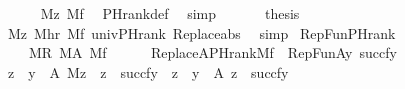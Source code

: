 \begin{isabellebody}
\ \ \ \ \isamarkupfalse%
\ {\isacartoucheopen}M{\isacharparenleft}{\kern0pt}z{\isacharparenright}{\kern0pt}{\isacartoucheclose}\ {\isacartoucheopen}M{\isacharparenleft}{\kern0pt}f{\isacharparenright}{\kern0pt}{\isacartoucheclose}\ \isamarkupfalse%
\ PHrank{\isacharunderscore}{\kern0pt}def\ \isamarkupfalse%
\ simp\isanewline
\ \ \isamarkupfalse%
\isanewline
\ \ \isamarkupfalse%
\ {\isacharquery}{\kern0pt}thesis\ \isamarkupfalse%
\ {\isacartoucheopen}M{\isacharparenleft}{\kern0pt}z{\isacharparenright}{\kern0pt}{\isacartoucheclose}\ {\isacartoucheopen}M{\isacharparenleft}{\kern0pt}hr{\isacharparenright}{\kern0pt}{\isacartoucheclose}\ {\isacartoucheopen}M{\isacharparenleft}{\kern0pt}f{\isacharparenright}{\kern0pt}{\isacartoucheclose}\ univ{\isacharunderscore}{\kern0pt}PHrank\ Replace{\isacharunderscore}{\kern0pt}abs\ \isamarkupfalse%
\ simp\isanewline
{}\isamarkupfalse%
%
\endisatagproof
{\isafoldproof}%
%
\isadelimproof
\isanewline
%
\endisadelimproof
\isanewline
{}\isamarkupfalse%
\ RepFun{\isacharunderscore}{\kern0pt}PHrank{\isacharcolon}{\kern0pt}\isanewline
\ \ \isanewline
\ \ \ \ {\isachardoublequoteopen}M{\isacharparenleft}{\kern0pt}R{\isacharparenright}{\kern0pt}{\isachardoublequoteclose}\ {\isachardoublequoteopen}M{\isacharparenleft}{\kern0pt}A{\isacharparenright}{\kern0pt}{\isachardoublequoteclose}\ {\isachardoublequoteopen}M{\isacharparenleft}{\kern0pt}f{\isacharparenright}{\kern0pt}{\isachardoublequoteclose}\ \isanewline
\ \ \isanewline
\ \ {\isachardoublequoteopen}Replace{\isacharparenleft}{\kern0pt}A{\isacharcomma}{\kern0pt}PHrank{\isacharparenleft}{\kern0pt}M{\isacharcomma}{\kern0pt}f{\isacharparenright}{\kern0pt}{\isacharparenright}{\kern0pt}\ {\isacharequal}{\kern0pt}\ RepFun{\isacharparenleft}{\kern0pt}A{\isacharcomma}{\kern0pt}{\isasymlambda}y{\isachardot}{\kern0pt}\ succ{\isacharparenleft}{\kern0pt}f{\isacharbackquote}{\kern0pt}y{\isacharparenright}{\kern0pt}{\isacharparenright}{\kern0pt}{\isachardoublequoteclose}\isanewline
%
\isadelimproof
%
\endisadelimproof
%
\isatagproof
{}\isamarkupfalse%
\ {\isacharminus}{\kern0pt}\isanewline
\ \ \isamarkupfalse%
\ {\isachardoublequoteopen}{\isacharbraceleft}{\kern0pt}z\ {\isachardot}{\kern0pt}\ y\ {\isasymin}\ A{\isacharcomma}{\kern0pt}\ M{\isacharparenleft}{\kern0pt}z{\isacharparenright}{\kern0pt}\ {\isasymand}\ z\ {\isacharequal}{\kern0pt}\ succ{\isacharparenleft}{\kern0pt}f{\isacharbackquote}{\kern0pt}y{\isacharparenright}{\kern0pt}{\isacharbraceright}{\kern0pt}\ {\isacharequal}{\kern0pt}\ {\isacharbraceleft}{\kern0pt}z\ {\isachardot}{\kern0pt}\ y\ {\isasymin}\ A{\isacharcomma}{\kern0pt}\ z\ {\isacharequal}{\kern0pt}\ succ{\isacharparenleft}{\kern0pt}f{\isacharbackquote}{\kern0pt}y{\isacharparenright}{\kern0pt}{\isacharbraceright}{\kern0pt}{\isachardoublequoteclose}\ \isanewline

\end{isabellebody}
